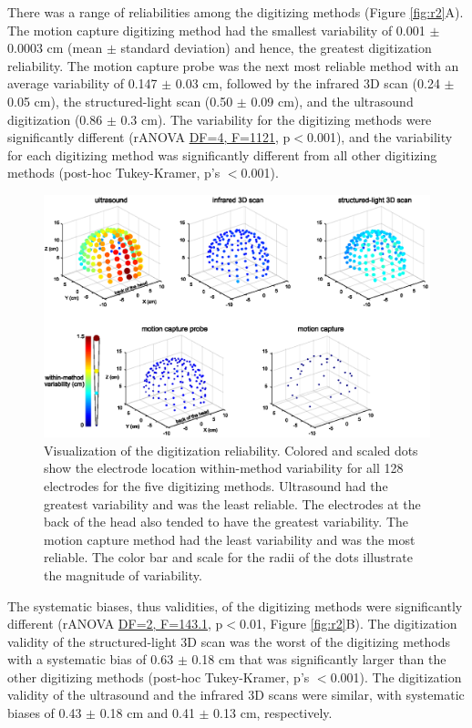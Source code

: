 \documentclass[../thesis_seyed.tex]{subfiles}
\begin{document}
There was a range of reliabilities among the digitizing methods (Figure \ref{fig:r2}A). The motion capture digitizing method had the smallest variability of 0.001 $\pm$ 0.0003 cm (mean $\pm$ standard deviation) and hence, the greatest digitization reliability. The motion capture probe was the next most reliable method with an average variability of 0.147 $\pm$ 0.03 cm, followed by the infrared 3D scan (0.24 $\pm$ 0.05 cm), the structured-light scan (0.50 $\pm$ 0.09 cm), and the ultrasound digitization (0.86 $\pm$ 0.3 cm). The variability for the digitizing methods were significantly different (rANOVA \ul{DF=4, F=1121,} p$<$0.001), and the variability for each digitizing method was significantly different from all other digitizing methods (post-hoc Tukey-Kramer, p's $<$0.001).

\begin{figure}[H]
    \centering
    \includegraphics[width=\linewidth]{../img/result1.eps}
    \caption{Visualization of the digitization reliability. Colored and scaled dots show the electrode location within-method variability for all 128 electrodes for the five digitizing methods. Ultrasound had the greatest variability and was the least reliable. The electrodes at the back of the head also tended to have the greatest variability. The motion capture method had the least variability and was the most reliable. The color bar and scale for the radii of the dots illustrate the magnitude of variability.}
    \label{fig:r1}
\end{figure}

The systematic biases, thus validities, of the digitizing methods were significantly different (rANOVA \ul{DF=2, F=143.1,} p$<$0.01, Figure \ref{fig:r2}B). The digitization validity of the structured-light 3D scan was the worst of the digitizing methods with a systematic bias of 0.63 $\pm$ 0.18 cm that was significantly larger than the other digitizing methods (post-hoc Tukey-Kramer, p's $<$0.001). The digitization validity of the ultrasound and the infrared 3D scans were similar, with systematic biases of 0.43 $\pm$ 0.18 cm and 0.41 $\pm$ 0.13 cm, respectively.
\end{document}
